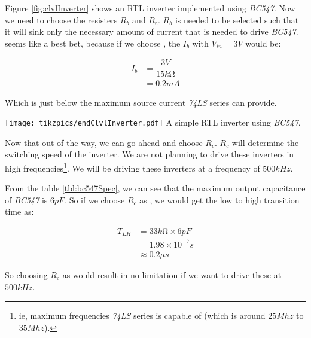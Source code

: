 \documentclass[../../main]{subfiles}
\begin{document}
\begin{center}
    {\begin{minipage} [c] {0.55\textwidth}
        Figure \ref{fig:clvlInverter} shows an RTL inverter implemented using \emph{BC547}.
        Now we need to choose the resisters $\si{R}_{b}$ and $\si{R}_{c}$. $\si{R}_{b}$
        is needed to be selected such that it will sink only the necessary amount of current
        that is needed to drive \emph{BC547}. \resValOneFiveK{} seems like a best bet, because if we
        choose \resValOneFiveK{}, the $\si{I}_{b}$ with $\si{V}_{in} = 3\si{V}$ would
        be:

        \begin{align}
            \si{I}_{b} &= \dfrac{3 \si{V}}{15\si{k \ohm}} \\
            &= 0.2 \si{mA}
        \end{align}

        Which is just below the maximum source current \emph{74LS} series can provide.

    \end{minipage}
    \hfill
    \begin{minipage} [c] {0.35\textwidth}
        \centering
        \texttt{[image: tikzpics/endClvlInverter.pdf]}
         {A simple RTL inverter using \emph{BC547}.}
        \label{fig:clvlInverter}
    \end{minipage}\hfill}
\end{center}


Now that out of the way, we can go ahead and choose $\si{R}_{c}$. $\si{R}_{c}$ will determine the
switching speed of the inverter. We are not planning to drive these inverters in high
frequencies\footnote{ie, maximum frequencies \emph{74LS} series is capable of (which is
around $25\si{Mhz}$ to $35\si{Mhz}$).}. We will be driving these inverters at a frequency
of $500\si{kHz}$.

From the table \ref{tbl:bc547Spec}, we can see that the maximum output capacitance of \emph{BC547}
is $6 \si{pF}$. So if we choose $\si{R}_{c}$ as \resValThreeThreeK{}, we would get the low to
high transition time as:

\begin{align}
    T_{LH} &= 33\si{k \ohm} \times 6 \si{pF} \\
    &= 1.98 \times 10^{-7} \si{s} \\
    &\approx 0.2 \si{\mu s}
\end{align}

So choosing $\si{R}_{c}$ as \resValThreeThreeK{} would result in no limitation if we want to drive
these at $500\si{kHz}$.

\end{document}
